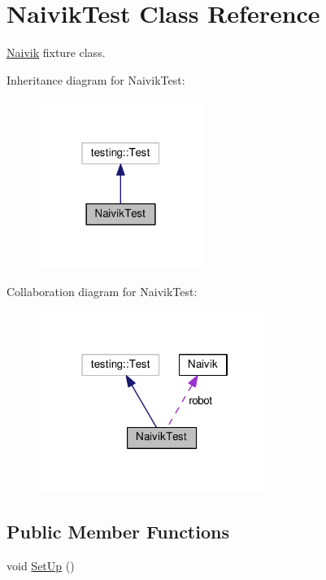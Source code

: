 \hypertarget{classNaivikTest}{}\section{Naivik\+Test Class Reference}
\label{classNaivikTest}


\hyperlink{classNaivik}{Naivik} fixture class.  




Inheritance diagram for Naivik\+Test\+:
\nopagebreak
\begin{figure}[H]
\begin{center}
\leavevmode
\includegraphics[width=151pt]{classNaivikTest__inherit__graph}
\end{center}
\end{figure}


Collaboration diagram for Naivik\+Test\+:
\nopagebreak
\begin{figure}[H]
\begin{center}
\leavevmode
\includegraphics[width=214pt]{classNaivikTest__coll__graph}
\end{center}
\end{figure}
\subsection*{Public Member Functions}
\begin{DoxyCompactItemize}
\item 
void \hyperlink{classNaivikTest_a86ab33fa14f17c2dab8ddd683e566107}{Set\+Up} ()
\end{DoxyCompactItemize}
